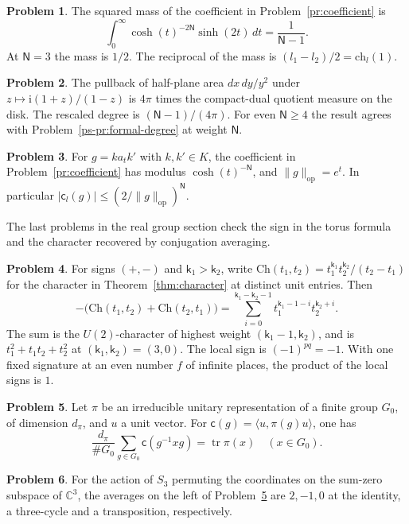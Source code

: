 \documentclass[reqno]{amsart}
\theoremstyle{definition}
\newtheorem{problem}{Problem}[section]
\newcommand{\C}{\mathbb C}
\newcommand{\cc}{\mathsf c}
\newcommand{\NN}{\mathsf N}
\newcommand{\kk}{\mathsf k}
\newcommand{\ch}{\mathrm{ch}}
\newcommand{\Ch}{\mathrm{Ch}}
\newcommand{\tr}{\operatorname{tr}}
\newcommand{\op}{\mathrm{op}}
\begin{document}
\begin{problem}\label{pr:degree}
The squared mass of the coefficient in Problem~\ref{pr:coefficient} is
\[
 \int_0^\infty \cosh(t)^{-2\NN}\sinh(2t)\,dt=\frac{1}{\NN-1}.
\]
At \(\NN=3\) the mass is \(1/2\). The reciprocal of the mass is \((l_1-l_2)/2=\ch_l(1)\).
\end{problem}

\begin{problem}\label{pr:half-plane}
The pullback of half-plane area \(dx\,dy/y^2\) under \(z\mapsto \mathrm{i}(1+z)/(1-z)\) is \(4\pi\) times the compact-dual quotient measure on the disk. The rescaled degree is \((\NN-1)/(4\pi)\). For even \(\NN\ge4\) the result agrees with Problem~\ref{ps-pr:formal-degree} at weight \(\NN\).
\end{problem}

\begin{problem}\label{pr:rank-decay}
For \(g=k a_t k'\) with \(k,k'\in K\), the coefficient in Problem~\ref{pr:coefficient} has modulus \(\cosh(t)^{-\NN}\), and \(\|g\|_{\op}=e^t\). In particular \(|\cc_l(g)|\le (2/\|g\|_{\op})^{\NN}\).
\end{problem}

The last problems in the real group section check the sign in the torus formula and the character recovered by conjugation averaging.

\begin{problem}\label{pr:sign}
For signs \((+,-)\) and \(\kk_1>\kk_2\), write
\(\Ch(t_1,t_2)=t_1^{\kk_1}t_2^{\kk_2}/(t_2-t_1)\) for the character in Theorem~\ref{thm:character} at distinct unit entries. Then
\[
 -\bigl(\Ch(t_1,t_2)+\Ch(t_2,t_1)\bigr)
  =\sum_{i=0}^{\kk_1-\kk_2-1} t_1^{\kk_1-1-i}t_2^{\kk_2+i}.
\]
The sum is the \(U(2)\)-character of highest weight \((\kk_1-1,\kk_2)\), and is \(t_1^2+t_1t_2+t_2^2\) at \((\kk_1,\kk_2)=(3,0)\). The local sign is \((-1)^{pq}=-1\). With one fixed signature at an even number \(f\) of infinite places, the product of the local signs is \(1\).
\end{problem}

\begin{problem}\label{pr:finite-orbital}
Let \(\pi\) be an irreducible unitary representation of a finite group \(G_0\), of dimension \(d_\pi\), and \(u\) a unit vector. For \(\cc(g)=\langle u,\pi(g)u\rangle\), one has
\[
 \frac{d_\pi}{\#G_0}\sum_{g\in G_0}\cc(g^{-1}xg)=\tr\pi(x)\quad(x\in G_0).
\]
\end{problem}

\begin{problem}\label{pr:s3}
For the action of \(S_3\) permuting the coordinates on the sum-zero subspace of \(\C^3\), the averages on the left of Problem~\ref{pr:finite-orbital} are \(2,-1,0\) at the identity, a three-cycle and a transposition, respectively.
\end{problem}
\end{document}
